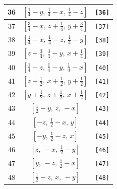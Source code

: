 \documentclass[fleqn,8pt]{jsarticle}
\begin{document}
\begin{longtable}{ccc}
36 & $\left[ \frac{1}{4} - y,\, \frac{1}{4} - x,\, \frac{1}{4} - z \right]$ & {\tt [36]} \\ \hline
37 & $\left[ \frac{3}{4} - x,\, z + \frac{1}{4},\, y + \frac{3}{4} \right]$ & {\tt [37]} \\ \hline
38 & $\left[ \frac{1}{4} - x,\, \frac{1}{4} - z,\, \frac{1}{4} - y \right]$ & {\tt [38]} \\ \hline
39 & $\left[ z + \frac{3}{4},\, \frac{3}{4} - y,\, x + \frac{1}{4} \right]$ & {\tt [39]} \\ \hline
40 & $\left[ \frac{1}{4} - z,\, \frac{1}{4} - y,\, \frac{1}{4} - x \right]$ & {\tt [40]} \\ \hline
41 & $\left[ z + \frac{1}{2},\, x + \frac{1}{2},\, y + \frac{1}{2} \right]$ & {\tt [41]} \\ \hline
42 & $\left[ y + \frac{1}{2},\, z + \frac{1}{2},\, x + \frac{1}{2} \right]$ & {\tt [42]} \\ \hline
43 & $\left[ \frac{1}{2} - y,\, z,\, - x \right]$ & {\tt [43]} \\ \hline
44 & $\left[ - z,\, \frac{1}{2} - x,\, y \right]$ & {\tt [44]} \\ \hline
45 & $\left[ - y,\, \frac{1}{2} - z,\, x \right]$ & {\tt [45]} \\ \hline
46 & $\left[ z,\, - x,\, \frac{1}{2} - y \right]$ & {\tt [46]} \\ \hline
47 & $\left[ y,\, - z,\, \frac{1}{2} - x \right]$ & {\tt [47]} \\ \hline
48 & $\left[ \frac{1}{2} - z,\, x,\, - y \right]$ & {\tt [48]} \\
\end{longtable}
\end{document}
